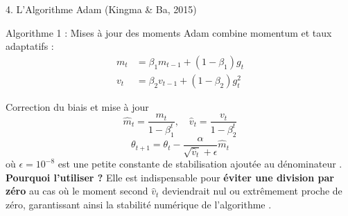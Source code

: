 \documentclass{beamer}
\begin{document}
\begin{frame}{4. L'Algorithme Adam (Kingma \& Ba, 2015)}
    \begin{block}{Algorithme 1 : Mises à jour des moments}
        Adam combine momentum et taux adaptatifs \cite{kingma2014adam} :
        \begin{align}
            m_t &= \beta_1 m_{t-1} + (1 - \beta_1) g_t \\
            v_t &= \beta_2 v_{t-1} + (1 - \beta_2) g_t^2
        \end{align}
    \end{block}
    \end{frame}
    \begin{frame}
\begin{block}{Correction du biais et mise à jour}
        \begin{equation}
            \hat{m}_t = \frac{m_t}{1 - \beta_1^t}, \quad \hat{v}_t = \frac{v_t}{1 - \beta_2^t}
        \end{equation}
        \begin{equation}
            \theta_{t+1} = \theta_t - \frac{\alpha}{\sqrt{\hat{v}_t} + \epsilon} \hat{m}_t
        \end{equation}
        où \textbf{$\epsilon = 10^{-8}$} est une petite constante de stabilisation ajoutée au dénominateur \cite{kingma2014adam}. 
        \textbf{Pourquoi l'utiliser ?} Elle est indispensable pour \textbf{éviter une division par zéro} au cas où le moment second $\hat{v}_t$ deviendrait nul ou extrêmement proche de zéro, garantissant ainsi la stabilité numérique de l'algorithme \cite{kingma2014adam}.
    \end{block}
\end{frame}
\end{document}
